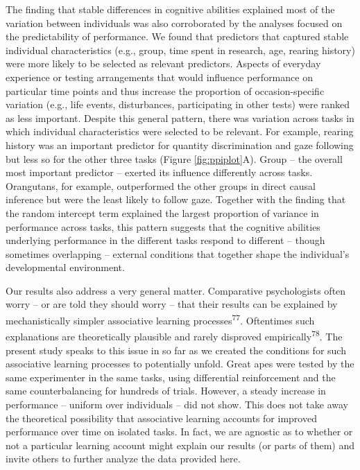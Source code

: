 \documentclass[
  man,floatsintext]{apa6}
\begin{document}
The finding that stable differences in cognitive abilities explained most of the variation between individuals was also corroborated by the analyses focused on the predictability of performance. We found that predictors that captured stable individual characteristics (e.g., group, time spent in research, age, rearing history) were more likely to be selected as relevant predictors. Aspects of everyday experience or testing arrangements that would influence performance on particular time points and thus increase the proportion of occasion-specific variation (e.g., life events, disturbances, participating in other tests) were ranked as less important. Despite this general pattern, there was variation across tasks in which individual characteristics were selected to be relevant. For example, rearing history was an important predictor for quantity discrimination and gaze following but less so for the other three tasks (Figure \ref{fig:ppiplot}A). Group -- the overall most important predictor -- exerted its influence differently across tasks. Orangutans, for example, outperformed the other groups in direct causal inference but were the least likely to follow gaze. Together with the finding that the random intercept term explained the largest proportion of variance in performance across tasks, this pattern suggests that the cognitive abilities underlying performance in the different tasks respond to different -- though sometimes overlapping -- external conditions that together shape the individual's developmental environment.

Our results also address a very general matter. Comparative psychologists often worry -- or are told they should worry -- that their results can be explained by mechanistically simpler associative learning processes\textsuperscript{77}. Oftentimes such explanations are theoretically plausible and rarely disproved empirically\textsuperscript{78}. The present study speaks to this issue in so far as we created the conditions for such associative learning processes to potentially unfold. Great apes were tested by the same experimenter in the same tasks, using differential reinforcement and the same counterbalancing for hundreds of trials. However, a steady increase in performance -- uniform over individuals -- did not show. This does not take away the theoretical possibility that associative learning accounts for improved performance over time on isolated tasks. In fact, we are agnostic as to whether or not a particular learning account might explain our results (or parts of them) and invite others to further analyze the data provided here.
\end{document}
